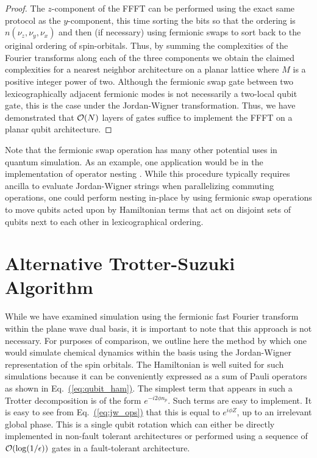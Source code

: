 \documentclass[superscriptaddress,aps,pra,nofootinbib,notitlepage,10pt,longbibliography]{revtex4-1}
\newcommand{\eq}[1]{Eq.~\hyperref[eq:#1]{(\ref*{eq:#1})}}
\begin{document}
\begin{proof}
The $z$-component of the FFFT can be performed using the exact same protocol as the $y$-component, this time sorting the bits so that the ordering is $n(\nu_z, \nu_y, \nu_x)$ and then (if necessary) using fermionic swaps to sort back to the original ordering of spin-orbitals. Thus, by summing the complexities of the Fourier transforms along each of the three components we obtain the claimed complexities for a nearest neighbor architecture on a planar lattice where $M$ is a positive integer power of two. Although the fermionic swap gate between two lexicographically adjacent fermionic modes is not necessarily a two-local qubit gate, this is the case under the Jordan-Wigner transformation. Thus, we have demonstrated that ${\cal O}(N)$ layers of gates suffice to implement the FFFT on a planar qubit architecture.
\end{proof}

Note that the fermionic swap operation has many other potential uses in quantum simulation. As an example, one application would be in the implementation of operator nesting \cite{Poulin2014}. While this procedure typically requires ancilla to evaluate Jordan-Wigner strings when parallelizing commuting operations, one could perform nesting in-place by using fermionic swap operations to move qubits acted upon by Hamiltonian terms that act on disjoint sets of qubits next to each other in lexicographical ordering.



\section{Alternative Trotter-Suzuki Algorithm}
\label{app:alt_trotter}
While we have examined simulation using the fermionic fast Fourier transform within the plane wave dual basis, it is important to note that this approach is not necessary.  For purposes of comparison, we outline here the method by which one would simulate chemical dynamics within the basis using the Jordan-Wigner representation of the spin orbitals. 
The Hamiltonian is well suited for such simulations because it can be conveniently expressed as a sum of Pauli operators as shown in \eq{qubit_ham}.
The simplest term that appears in such a Trotter decomposition is of the form $e^{-i 2\phi n_p}$.  Such terms are easy to implement.  It is easy to see from \eq{jw_ops} that this is equal to $e^{i\phi Z}$, up to an irrelevant global phase. This is a single qubit rotation which can either be directly implemented in non-fault tolerant architectures or performed using a sequence of ${\cal O}(\log(1/\epsilon))$ gates in a fault-tolerant architecture.
\end{document}
